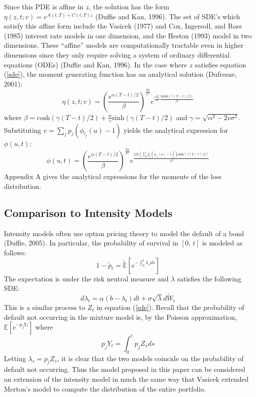\documentclass[12pt]{article}
\theoremstyle{definition}
\begin{document}
Since this PDE is affine in \(z\), the solution has the form \(\eta(z, t; v)=e^{A(t, T)+C(t, T)z}\) (Duffie and Kan, 1996).  The set of SDE's which satisfy this affine form include the Vasicek (1977) and Cox, Ingersoll, and Ross (1985) interest rate models in one dimension, and the Heston (1993) model in two dimensions.  These ``affine'' models are computationally tractable even in higher dimensions since they only require solving a system of ordinary differential equations (ODEs) (Duffie and Kan, 1996).  In the case where \(z\) satisfies equation (\ref{sde}), the moment generating function has an analytical solution (Dufresne, 2001): 
\begin{equation} \label{eq1}\eta(z, t; v)= \left(\frac{e^{\alpha(T-t)/2}}{\beta}\right)^\frac{2\alpha}{\sigma^2} e^{\frac{vZ_t}{\gamma} \frac{2\text{sinh}(\gamma(T-t)/2)}{\beta}}\end{equation}
where \(\beta=\text{cosh}(\gamma(T-t)/2)+\frac{\alpha}{\gamma}\text{sinh}(\gamma(T-t)/2)\) and \(\gamma=\sqrt{\alpha^2-2v\sigma^2}\).  Substituting  \(v=\sum_j  p_j\left(\phi_{l_j}(u)-1\right)\) yields the analytical expression for \(\phi(u, t)\):
\begin{equation}
\phi(u, t)= \left(\frac{e^{\alpha(T-t)/2}}{\beta}\right)^\frac{2\alpha}{\sigma^2} e^{\frac{2 Z_t \left(\sum_j  p_j \left(\phi_{l_j}(u)-1\right)\right)\text{sinh}(\gamma(T-t)/2)}{\gamma \beta} }
\end{equation}
  Appendix A gives the analytical expressions for the moments of the loss distribution.

\subsection{Comparison to Intensity Models}

Intensity models often use option pricing theory to model the default of a bond (Duffie, 2005).  In particular, the probability of survival in \([0,\,t]\) is modeled as follows:
\begin{equation}1-\tilde{p}_t=\mathbb{\tilde{E}}\left[e^{-\int_0 ^t \lambda_s ds}\right]\end{equation}
The expectation is under the risk neutral measure and \(\lambda\) satisfies the following SDE:
\begin{equation}d\lambda_t=\alpha(b-\lambda_t)dt+\sigma\sqrt{\lambda} d\tilde{W}_t\end{equation}
This is a similar process to \(Z_t\) in equation (\ref{sde}).  Recall that the probability of default not occurring in the mixture model is, by the Poisson approximation, \(\mathbb{E}\left[e^{-p_jY_t}\right]\) where
\begin{equation} p_j Y_t= \int_0^t p_j Z_s ds \end{equation}
Letting \(\lambda_s=p_jZ_s\), it is clear that the two models coincide on the probability of default not occurring.  Thus the model proposed in this paper can be considered an extension of the intensity model  in much the same way that Vasicek extended Merton's model to compute the distribution of the entire portfolio.
\end{document}
